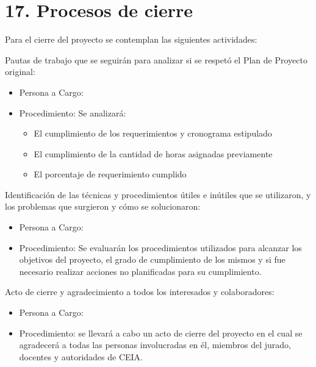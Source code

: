 \documentclass[11pt]{charter}
\begin{document}
\begin{longtable}{|m{1cm}|m{3.5cm}|m{2.2cm}|m{2cm}|m{3cm}|m{1.5cm}|}
\end{longtable}


\section{17. Procesos de cierre}    
\label{sec:cierre}


Para el cierre del proyecto se contemplan las siguientes actividades:

Pautas de trabajo que se seguirán para analizar si se respetó el Plan de Proyecto original:
\begin{itemize}
\item Persona a Cargo: \authorname 
\item Procedimiento: Se analizará:
\begin{itemize}
\item El cumplimiento de los requerimientos y cronograma estipulado
\item El cumplimiento de la cantidad de horas asignadas previamente
\item El porcentaje de requerimiento cumplido
\end{itemize}
\end{itemize}
Identificación de las técnicas y procedimientos útiles e inútiles que se utilizaron, y los problemas que surgieron y cómo se solucionaron:
\begin{itemize}
\item Persona a Cargo: \authorname 
\item Procedimiento: Se evaluarán los procedimientos utilizados para alcanzar los objetivos del proyecto, el grado de cumplimiento de los mismos y si fue necesario realizar acciones no planificadas para su cumplimiento.
\end{itemize}
Acto de cierre y agradecimiento a todos los interesados y colaboradores:
\begin{itemize}
\item Persona a Cargo: \authorname 
\item Procedimiento: se llevará a cabo un acto de cierre del proyecto en el cual se agradecerá a todas las personas involucradas en él, miembros del jurado, docentes y autoridades de CEIA.
\end{itemize}
\end{document}
